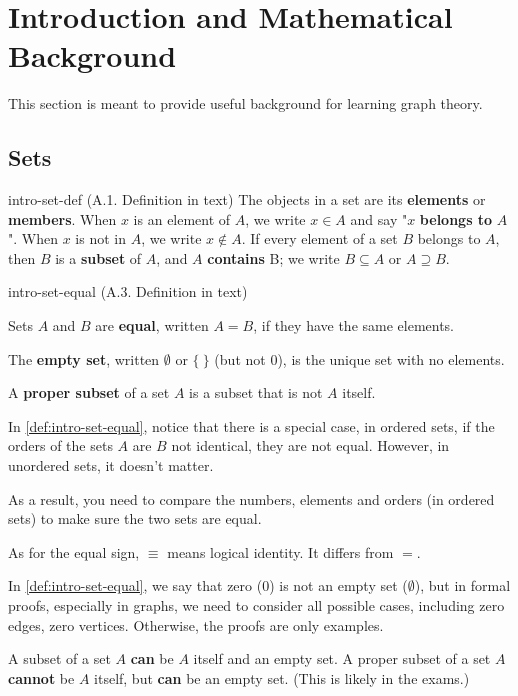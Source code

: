 \documentclass[../src/handouts/main.tex]{subfiles}
\begin{document}
\section{Introduction and Mathematical Background}

This section is meant to provide useful background for learning graph theory.

\subsection{Sets}

\begin{definition}{}{intro-set-def}
  (A.1. Definition in text)
  The objects in a set are its \textbf{elements} or \textbf{members}.
  When $x$ is an element of $A$, we write $x \in A$ and say "$x$ \textbf{belongs to} $A$".
  When $x$ is not in $A$, we write $x \notin A$.
  If every element of a set $B$ belongs to $A$, then $B$ is a \textbf{subset} of $A$, and $A$ \textbf{contains} B; we write $B \subseteq A$ or $A \supseteq B$.
\end{definition}

\begin{definition}{}{intro-set-equal}
  (A.3. Definition in text)

  Sets $A$ and $B$ are \textbf{equal}, written $A = B$, if they have the same elements.

  The \textbf{empty set}, written $\emptyset$ or $\lbrace\ \rbrace$ (but not 0), is the unique set with no elements.

  A \textbf{proper subset} of a set $A$ is a subset that is not $A$ itself.
\end{definition}

In \cref{def:intro-set-equal}, notice that there is a special case, in ordered sets, if the orders of the sets $A$ are $B$ not identical, they are not equal. However, in unordered sets, it doesn't matter.

As a result, you need to compare the numbers, elements and orders (in ordered sets) to make sure the two sets are equal.

As for the equal sign, $\equiv$ means logical identity. It differs from $=$.

In \cref{def:intro-set-equal}, we say that zero (0) is not an empty set ($\emptyset$), but in formal proofs, especially in graphs, we need to consider all possible cases, including zero edges, zero vertices. Otherwise, the proofs are only examples.

A subset of a set $A$ \textbf{can} be $A$ itself and an empty set. A proper subset of a set $A$ \textbf{cannot} be $A$ itself, but \textbf{can} be an empty set. (This is likely in the exams.)
\end{document}
